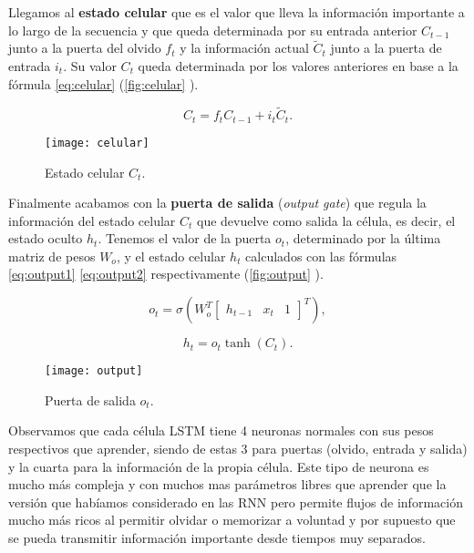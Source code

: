 Llegamos al \textbf{estado celular} que es el valor que lleva la información importante a lo largo de la secuencia y que queda determinada por su entrada anterior $C_{t-1}$ junto a la puerta del olvido $f_t$ y la información actual $\widetilde{C}_t$ junto a la puerta de entrada $i_t$. Su valor $C_t$ queda determinada por los valores anteriores en base a la fórmula \eqref{eq:celular} (\autoref{fig:celular} \cite{christopher2015lstm}).

\begin{equation}
  C_t = f_t C_{t-1} + i_t \widetilde{C}_t.
  \label{eq:celular}
\end{equation}

\begin{figure}[htpb]
  \centering
  \texttt{[image: celular]}
  \caption{Estado celular $C_t$.}
  \label{fig:celular}
\end{figure}

Finalmente acabamos con la \textbf{puerta de salida} (\emph{output gate}) que regula la información del estado celular $C_t$ que devuelve como salida la célula, es decir, el estado oculto $h_t$. Tenemos el valor de la puerta $o_t$, determinado por la última matriz de pesos $W_o$, y el estado celular $h_t$ calculados con las fórmulas \eqref{eq:output1} \eqref{eq:output2} respectivamente (\autoref{fig:output} \cite{christopher2015lstm}).

\begin{equation}
  o_t = \sigma\left(W_o^T \begin{bmatrix} h_{t-1} & x_t & 1 \end{bmatrix}^T\right),
  \label{eq:output1}
\end{equation}

\begin{equation}
  h_t = o_t \tanh\left(C_t\right).
  \label{eq:output2}
\end{equation}

\begin{figure}[htpb]
  \centering
  \texttt{[image: output]}
  \caption{Puerta de salida $o_t$.}
  \label{fig:output}
\end{figure}

Observamos que cada célula LSTM tiene 4 neuronas normales con sus pesos respectivos que aprender, siendo de estas 3 para puertas (olvido, entrada y salida) y la cuarta para la información de la propia célula. Este tipo de neurona es mucho más compleja y con muchos mas parámetros libres que aprender que la versión que habíamos considerado en las RNN pero permite flujos de información mucho más ricos al permitir olvidar o memorizar a voluntad y por supuesto que se pueda transmitir información importante desde tiempos muy separados.

